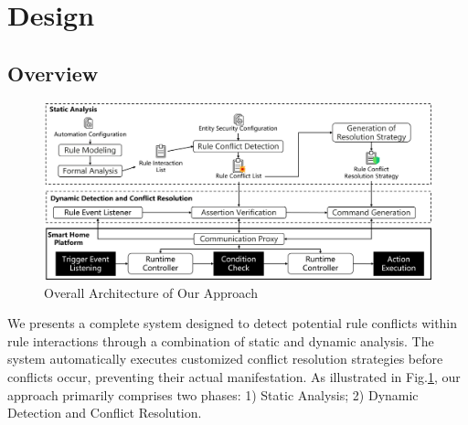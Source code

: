 \section{Design}

\subsection{Overview}
\begin{figure}[htbp]
	\centering
	\includegraphics[width=\textwidth]{figure/overall_design.png}
	\caption{Overall Architecture of Our Approach}
	\label{overall_design}
\end{figure}
We presents a complete system designed to detect potential rule conflicts within rule interactions through a combination of static and dynamic analysis. The system automatically executes customized conflict resolution strategies before conflicts occur, preventing their actual manifestation. As illustrated in Fig.\ref{overall_design}, our approach primarily comprises two phases: 1) Static Analysis; 2) Dynamic Detection and Conflict Resolution.


